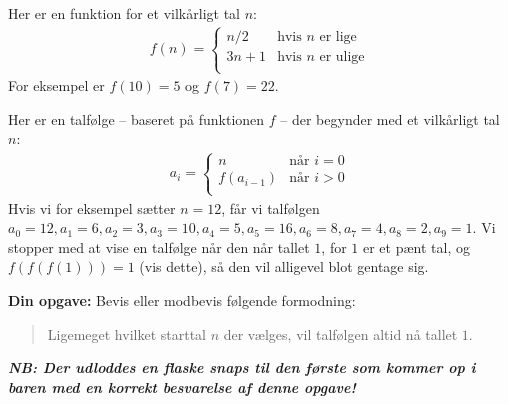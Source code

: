 Her er en funktion for et vilkårligt tal $n$:
\begin{align*}
f(n) = \begin{cases}
n/2 &\text{hvis }n\text{ er lige}\\
3n + 1 &\text{hvis }n\text{ er ulige}\\
\end{cases}
\end{align*}
For eksempel er $f(10) = 5$ og $f(7) = 22$.

Her er en talfølge -- baseret på funktionen $f$ -- der begynder med et
vilkårligt tal $n$:
\begin{align*}
a_i = \begin{cases}
n &\text{når }i = 0\\
f(a_{i - 1}) &\text{når }i > 0\\
\end{cases}
\end{align*}
Hvis vi for eksempel sætter $n = 12$, får vi talfølgen
$a_0 = 12, a_1 = 6, a_2 = 3, a_3 = 10, a_4 = 5, a_5 = 16, a_6 = 8, a_7 = 4, a_8
= 2, a_9 = 1$.  Vi stopper med at vise en talfølge når den når tallet $1$, for
$1$ er et pænt tal, og $f(f(f(1))) = 1$ (vis dette), så den vil alligevel blot
gentage sig.

\textbf{Din opgave:} Bevis eller modbevis følgende formodning:
\begin{quote}
Ligemeget hvilket starttal $n$ der vælges, vil talfølgen altid nå tallet $1$.
\end{quote}

\textbf{\emph{NB: Der udloddes en flaske snaps til den første som kommer op i
baren med en korrekt besvarelse af denne opgave!}}
